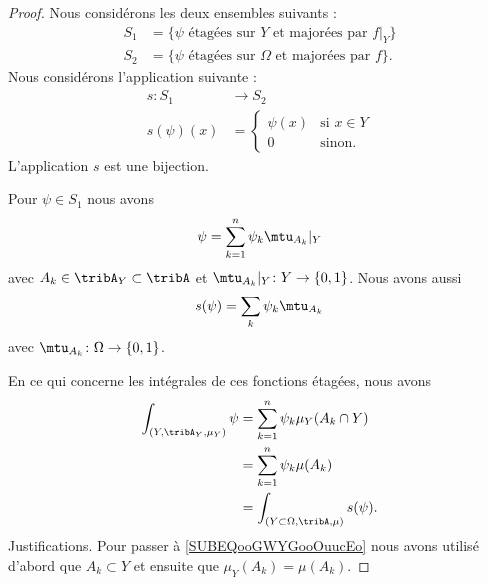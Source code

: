\begin{proof}
	Nous considérons les deux ensembles suivants :
	\begin{subequations}
		\begin{align}
			S_1 & =\{ \psi\text{ étagées sur } Y\text{ et majorées par } f|_Y \}    \\
			S_2 & =\{ \psi\text{ étagées sur } \Omega\text{ et majorées par } f \}.
		\end{align}
	\end{subequations}
	Nous considérons l'application suivante :
	\begin{equation}
		\begin{aligned}
			s\colon S_1 & \to S_2                      \\
			s(\psi)(x)  & =\begin{cases}
				               \psi(x) & \text{si } x\in Y \\
				               0       & \text{sinon.}
			               \end{cases}
		\end{aligned}
	\end{equation}
	L'application \( s\) est une bijection.

	Pour \( \psi\in S_1\) nous avons
	\begin{equation}
		\psi=\sum_{k=1}^n\psi_k\mtu_{A_k}|_Y
	\end{equation}
	avec \( A_k\in \tribA_Y\subset \tribA\) et \( \mtu_{A_k}|_Y\colon Y\to \{ 0,1 \}\). Nous avons aussi
	\begin{equation}
		s(\psi)=\sum_{k}\psi_k\mtu_{A_k}
	\end{equation}
	avec \( \mtu_{A_k}\colon \Omega\to \{ 0,1 \}\).

	En ce qui concerne les intégrales de ces fonctions étagées, nous avons
	\begin{subequations}
		\begin{align}
			\int_{(Y,\tribA_Y,\mu_Y)}\psi & =\sum_{k=1}^n\psi_k\mu_Y(A_k\cap Y)                     \\
			                              & =\sum_{k=1}^n\psi_k\mu(A_k) \label{SUBEQooGWYGooOuucEo} \\
			                              & =\int_{(Y\subset \Omega,\tribA,\mu)}s(\psi).
		\end{align}
	\end{subequations}
	Justifications. Pour passer à \eqref{SUBEQooGWYGooOuucEo} nous avons utilisé d'abord que \( A_k\subset Y\) et ensuite que \( \mu_Y(A_k)=\mu(A_k)\).


\end{proof}
